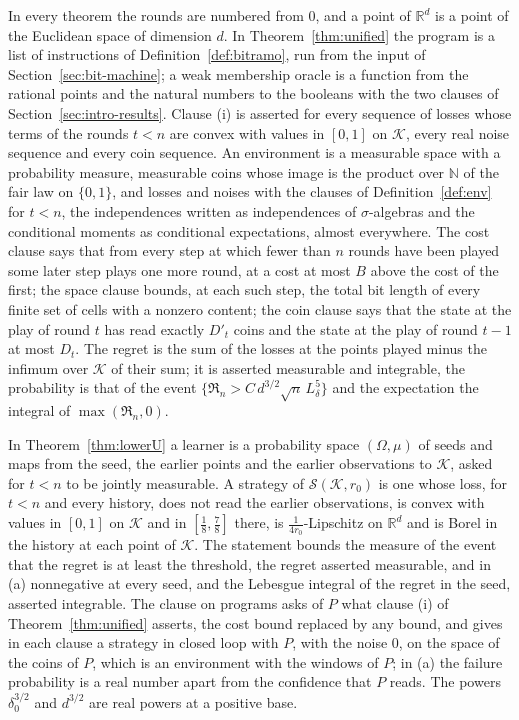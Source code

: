 \documentclass[11pt]{amsart}
\theoremstyle{definition}
\numberwithin{equation}{section}
\newcommand{\R}{\mathbb{R}}
\newcommand{\cK}{\mathcal{K}}
\newcommand{\Reg}{\mathfrak{R}}
\begin{document}
In every theorem the rounds are numbered from $0$, and a point of $\R^d$ is a point of the Euclidean space of dimension $d$. In Theorem~\ref{thm:unified} the program is a list of instructions of Definition~\ref{def:bitramo}, run from the input of Section~\ref{sec:bit-machine}; a weak membership oracle is a function from the rational points and the natural numbers to the booleans with the two clauses of Section~\ref{sec:intro-results}. Clause (i) is asserted for every sequence of losses whose terms of the rounds $t<n$ are convex with values in $[0,1]$ on $\cK$, every real noise sequence and every coin sequence. An environment is a measurable space with a probability measure, measurable coins whose image is the product over $\mathbb N$ of the fair law on $\{0,1\}$, and losses and noises with the clauses of Definition~\ref{def:env} for $t<n$, the independences written as independences of $\sigma$-algebras and the conditional moments as conditional expectations, almost everywhere. The cost clause says that from every step at which fewer than $n$ rounds have been played some later step plays one more round, at a cost at most $B$ above the cost of the first; the space clause bounds, at each such step, the total bit length of every finite set of cells with a nonzero content; the coin clause says that the state at the play of round $t$ has read exactly $D'_t$ coins and the state at the play of round $t-1$ at most $D_t$. The regret is the sum of the losses at the points played minus the infimum over $\cK$ of their sum; it is asserted measurable and integrable, the probability is that of the event $\{\Reg_n>C\,d^{3/2}\sqrt n\,L_\delta^5\}$ and the expectation the integral of $\max(\Reg_n,0)$.

In Theorem~\ref{thm:lowerU} a learner is a probability space $(\Omega,\mu)$ of seeds and maps from the seed, the earlier points and the earlier observations to $\cK$, asked for $t<n$ to be jointly measurable. A strategy of $\mathcal S(\cK,r_0)$ is one whose loss, for $t<n$ and every history, does not read the earlier observations, is convex with values in $[0,1]$ on $\cK$ and in $[\frac18,\frac78]$ there, is $\frac1{4r_0}$-Lipschitz on $\R^d$ and is Borel in the history at each point of $\cK$. The statement bounds the measure of the event that the regret is at least the threshold, the regret asserted measurable, and in (a) nonnegative at every seed, and the Lebesgue integral of the regret in the seed, asserted integrable. The clause on programs asks of $P$ what clause (i) of Theorem~\ref{thm:unified} asserts, the cost bound replaced by any bound, and gives in each clause a strategy in closed loop with $P$, with the noise $0$, on the space of the coins of $P$, which is an environment with the windows of $P$; in (a) the failure probability is a real number apart from the confidence that $P$ reads. The powers $\delta_0^{3/2}$ and $d^{3/2}$ are real powers at a positive base.
\end{document}
